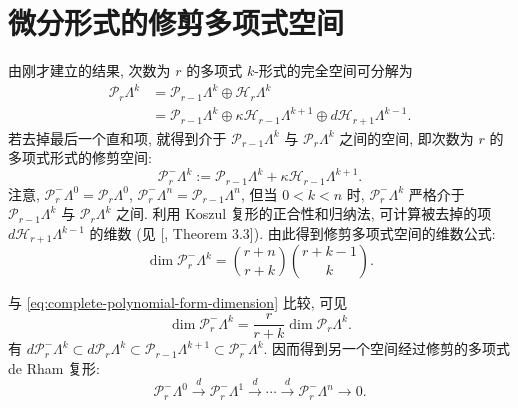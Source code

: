 \section{{微分形式的修剪多项式空间}}\label{sec:trimmed-polynomial-forms}

{由刚才建立的结果, 次数为 $r$ 的多项式 $k$-形式的完全空间可分解为}
\[
\begin{aligned}
\mathcal P_r\Lambda^k&=\mathcal P_{r-1}\Lambda^k\oplus\mathcal H_r\Lambda^k\\
&=\mathcal P_{r-1}\Lambda^k\oplus\kappa\mathcal H_{r-1}\Lambda^{k+1}\oplus d\mathcal H_{r+1}\Lambda^{k-1}.
\end{aligned}
\]
{若去掉最后一个直和项, 就得到介于 $\mathcal P_{r-1}\Lambda^k$ 与 $\mathcal P_r\Lambda^k$ 之间的空间, 即次数为 $r$ 的多项式形式的修剪空间:}
\[
\mathcal P_r^-\Lambda^k:=\mathcal P_{r-1}\Lambda^k+\kappa\mathcal H_{r-1}\Lambda^{k+1}.
\]
{注意, $\mathcal P_r^-\Lambda^0=\mathcal P_r\Lambda^0$, $\mathcal P_r^-\Lambda^n=\mathcal P_{r-1}\Lambda^n$, 但当 $0<k<n$ 时, $\mathcal P_r^-\Lambda^k$ 严格介于 $\mathcal P_{r-1}\Lambda^k$ 与 $\mathcal P_r\Lambda^k$ 之间. 利用 Koszul 复形的正合性和归纳法, 可计算被去掉的项 $d\mathcal H_{r+1}\Lambda^{k-1}$ 的维数 (见 [, Theorem 3.3]). 由此得到修剪多项式空间的维数公式:}
\[
\dim\mathcal P_r^-\Lambda^k=\binom{r+n}{r+k}\binom{r+k-1}k.
\]

{与 \eqref{eq:complete-polynomial-form-dimension} 比较, 可见}
\[
\dim\mathcal P_r^-\Lambda^k=\frac r{r+k}\dim\mathcal P_r\Lambda^k.
\]
{有 $d\mathcal P_r^-\Lambda^k\subset d\mathcal P_r\Lambda^k\subset\mathcal P_{r-1}\Lambda^{k+1}\subset\mathcal P_r^-\Lambda^k$. 因而得到另一个空间经过修剪的多项式 de Rham 复形:}
\begin{equation}\label{eq:trimmed-polynomial-de-rham-complex}
\mathcal P_r^-\Lambda^0\xrightarrow{d}\mathcal P_r^-\Lambda^1\xrightarrow{d}\cdots\xrightarrow{d}\mathcal P_r^-\Lambda^n\to0.
\end{equation}

